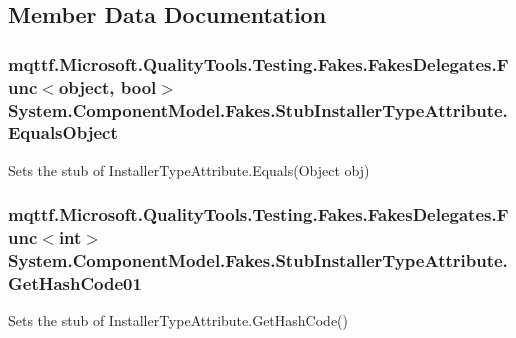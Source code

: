 \subsection{Member Data Documentation}
\hypertarget{class_system_1_1_component_model_1_1_fakes_1_1_stub_installer_type_attribute_a9e6140629d7f819dd342a6279b0f27a2}{
\subsubsection[{Equals\-Object}]{\setlength{\rightskip}{0pt plus 5cm}mqttf.\-Microsoft.\-Quality\-Tools.\-Testing.\-Fakes.\-Fakes\-Delegates.\-Func$<$object, bool$>$ System.\-Component\-Model.\-Fakes.\-Stub\-Installer\-Type\-Attribute.\-Equals\-Object}}\label{class_system_1_1_component_model_1_1_fakes_1_1_stub_installer_type_attribute_a9e6140629d7f819dd342a6279b0f27a2}


Sets the stub of Installer\-Type\-Attribute.\-Equals(\-Object obj)

\hypertarget{class_system_1_1_component_model_1_1_fakes_1_1_stub_installer_type_attribute_a1e172427d37c3f283e7bfc2628662f7c}{
\subsubsection[{Get\-Hash\-Code01}]{\setlength{\rightskip}{0pt plus 5cm}mqttf.\-Microsoft.\-Quality\-Tools.\-Testing.\-Fakes.\-Fakes\-Delegates.\-Func$<$int$>$ System.\-Component\-Model.\-Fakes.\-Stub\-Installer\-Type\-Attribute.\-Get\-Hash\-Code01}}\label{class_system_1_1_component_model_1_1_fakes_1_1_stub_installer_type_attribute_a1e172427d37c3f283e7bfc2628662f7c}


Sets the stub of Installer\-Type\-Attribute.\-Get\-Hash\-Code()

